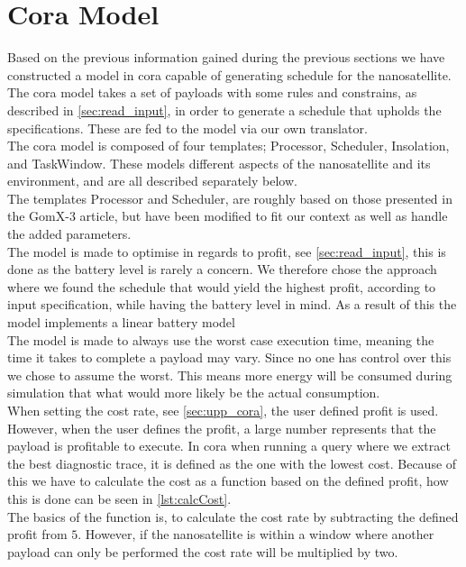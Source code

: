 \section{Cora Model} \label{sec:cora}
Based on the previous information gained during the previous sections we have constructed a model in \gls{cora} capable of generating schedule for the nanosatellite. The \gls{cora} model takes a set of payloads with some rules and constrains, as described in \cref{sec:read_input}, in order to generate a schedule that upholds the specifications. These are fed to the model via our own translator.\\
The \gls{cora} model is composed of four templates; Processor, Scheduler, Insolation, and TaskWindow. These models different aspects of the nanosatellite and its environment, and are all described separately below.\\
The templates Processor and Scheduler, are roughly based on those presented in the GomX-3 article\cite{gomx3}, but have been modified to fit our context as well as handle the added parameters.\\
The model is made to optimise in regards to profit, see \cref{sec:read_input}, this is done as the battery level is rarely a concern\cite{gom_space_conversation}. We therefore chose the approach where we found the schedule that would yield the highest profit, according to input specification, while having the battery level in mind. As a result of this the model implements a linear battery model\\
The model is made to always use the worst case execution time, meaning the time it takes to complete a payload may vary. Since no one has control over this we chose to assume the worst. This means more energy will be consumed during simulation that what would more likely be the actual consumption.\\
When setting the cost rate, see \cref{sec:upp_cora}, the user defined profit is used. However, when the user defines the profit, a large number represents that the payload is profitable to execute. In \gls{cora} when running a query where we extract the best diagnostic trace, it is defined as the one with the lowest cost. Because of this we have to calculate the cost as a function based on the defined profit, how this is done can be seen in \cref{lst:calcCost}.\\
The basics of the function  is, to calculate the cost rate by subtracting the defined profit from $5$. However, if the nanosatellite is within a window where another payload can only be performed the cost rate will be multiplied by two.\\


